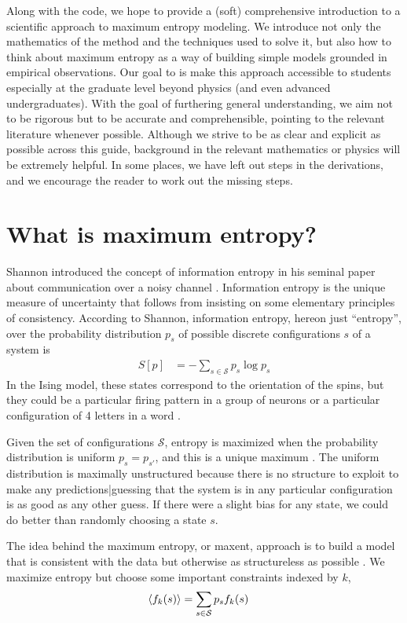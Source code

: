 \documentclass[aps,prl,twocolumn]{revtex4-1}
\begin{document}
Along with the code, we hope to provide a (soft) comprehensive introduction to a scientific approach to maximum entropy modeling. We introduce not only the mathematics of the method and the techniques used to solve it, but also how to think about maximum entropy as a way of building simple models grounded in empirical observations.
Our goal to is make this approach accessible to students especially at the graduate level beyond physics (and even advanced undergraduates). With the goal of furthering general understanding, we aim not to be rigorous but to be accurate and comprehensible, pointing to the relevant literature whenever possible. Although we strive to be as clear and explicit as possible across this guide, background in the relevant mathematics or physics will be extremely helpful. In some places, we have left out steps in the derivations, and we encourage the reader to work out the missing steps.

\section{What is maximum entropy?}
Shannon introduced the concept of information entropy in his seminal paper about communication over a noisy channel \cite{Shannon:1948wk}. Information entropy is the unique measure of uncertainty that follows from insisting on some elementary principles of consistency. According to Shannon, information entropy, hereon just ``entropy'', over the probability distribution $p_s$ of possible discrete configurations $s$ of a system is
\begin{align}
	S[p] &= -\sum_{s\in \mathcal{S}} p_s \log p_s
\end{align}
In the Ising model, these states correspond to the orientation of the spins, but they could be a particular firing pattern in a group of neurons \cite{Schneidman:2006he} or a particular configuration of 4 letters in a word \cite{Stephens:2010hi}.

Given the set of configurations $\mathcal{S}$, entropy is maximized when the probability distribution is uniform $p_s = p_{s'}$, and this is a unique maximum \cite{Cover:2006tl}. The uniform distribution is maximally unstructured because there is no structure to exploit to make any predictions|guessing that the system is in any particular configuration is as good as any other guess. If there were a slight bias for any state, we could do better than randomly choosing a state $s$.

The idea behind the maximum entropy, or maxent, approach is to build a model that is consistent with the data but otherwise as structureless as possible \cite{Bretthorst:2003ua,Jaynes:1957fy}.
We maximize entropy but choose some important constraints indexed by $k$,
\begin{align}
	\left<f_k(s)\right> &= \sum_{s\in \mathcal{S}} p_s f_k(s)
\end{align}
\end{document}
